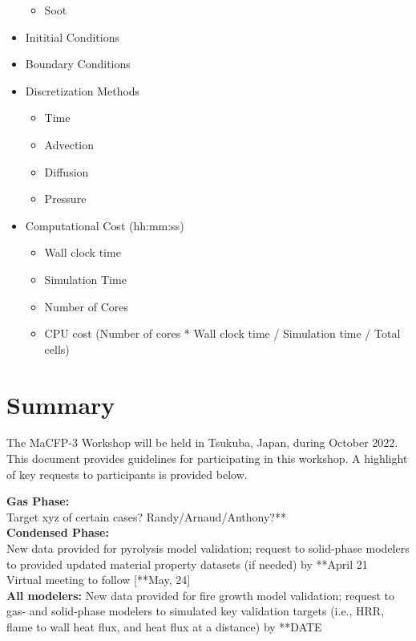 \documentclass[12pt]{article}
\begin{document}
\begin{itemize}[noitemsep]
\begin{itemize}[noitemsep]
 	\item Soot 
 	\end{itemize}
 \item Inititial Conditions
 \item Boundary Conditions
 \item Discretization Methods
 	\begin{itemize}[noitemsep]
 	\item Time
 	\item Advection
 	\item Diffusion
 	\item Pressure
 	\end{itemize}
 \item Computational Cost (hh:mm:ss)
 	\begin{itemize}[noitemsep]
 	\item Wall clock time
 	\item Simulation Time
 	\item Number of Cores
 	\item CPU cost (Number of cores * Wall clock time / Simulation time / Total cells)
 	\end{itemize}
\end{itemize}

\clearpage
\section{Summary}
\label{Sec:Summary}
The MaCFP-3 Workshop will be held in Tsukuba, Japan, during October 2022. This document provides guidelines for participating in this workshop. A highlight of key requests to participants is provided below.

\textbf{Gas Phase:}\\
Target xyz of certain cases? Randy/Arnaud/Anthony?**\\

\textbf{Condensed Phase:}\\
New data provided for pyrolysis model validation; request to solid-phase modelers to provided updated material property datasets (if needed) by **April 21\\
Virtual meeting to follow [**May, 24]\\

\textbf{All modelers:}
New data provided for fire growth model validation; request to gas- and solid-phase modelers to simulated key validation targets (i.e., HRR, flame to wall heat flux, and heat flux at a distance) by **DATE\\
\end{document}
